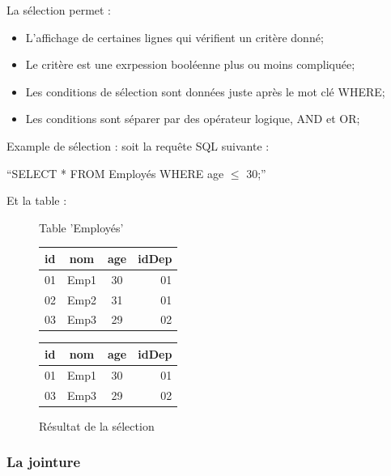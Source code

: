 \documentclass[oneside,13pt,a4paper]{report}
\begin{document}
La sélection permet :
\begin{itemize}
 	\item L'affichage de certaines lignes qui vérifient un critère donné;
	\item Le critère est une exrpession booléenne plus ou moins compliquée;
	\item Les conditions de sélection sont données juste après le mot clé WHERE;
	\item Les conditions sont séparer par des opérateur logique, AND et OR;
\end{itemize}
\pagebreak

Example de sélection :
soit la requête SQL suivante :

\begin{center}
	\enquote{SELECT * FROM Employés WHERE age $\leq$ 30;}
\end{center}

Et la table :
\begin{figure}[h]
	\begin{minipage}[c]{.46\linewidth}
		\centering
		\caption{Table 'Employés'}
		\begin{tabular}{|l|c|c|r|}
			\hline
			id   & nom  & age & idDep
			\\
			\hline
			01 & Emp1 &  30  & 01 \\
			02 & Emp2 &  31  & 01 \\
			03 & Emp3 &  29  & 02 \\
			\hline
		\end{tabular}
	\end{minipage}
	\hfill%
	\begin{minipage}[c]{.46\linewidth}
		\centering
		\caption{Résultat de la sélection}
		\vspace{0.1cm}
		\begin{tabular}{|l|c|c|r|}
			\hline
			id   & nom   & age & idDep
			\\
			\hline
			01 & Emp1 &  30  & 01 \\
			03 & Emp3 &  29  & 02 \\
			\hline
		\end{tabular}
	\end{minipage}
\end{figure}

\subsubsection{La jointure}
\end{document}

